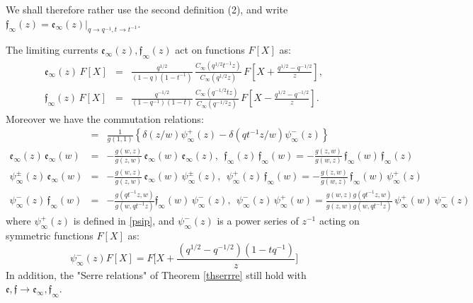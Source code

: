 We shall therefore rather use the second definition (2), and write
${\mathfrak f}_\infty(z)={\mathfrak e}_\infty(z)\vert_{q\to q^{-1},t\to t^{-1}}$.

\begin{thm}\label{bobothm}
The limiting currents ${\mathfrak e}_\infty(z),{\mathfrak f}_\infty(z)$ act on functions 
$F[X]$ as:
\begin{eqnarray*}
{\mathfrak e}_\infty(z)\, F[X] 
&=&\frac{q^{1/2}}{(1-q)(1-t^{-1})} \,\frac{C_\infty(q^{1/2}t^{-1}z)}{C_\infty(q^{1/2}z)} \,
F\left[ X+\frac{q^{1/2}-q^{-1/2}}{z}\right],\\
{\mathfrak f}_\infty(z)\, F[X] 
&=&\frac{q^{-1/2}}{(1-q^{-1})(1-t)}\,\frac{C_\infty(q^{-1/2}t z)}{C_\infty(q^{-1/2}z)} \,
F\left[ X-\frac{q^{1/2}-q^{-1/2}}{z}\right].
\end{eqnarray*}
Moreover we have the commutation relations:
\begin{eqnarray*}[{\mathfrak e}_\infty(z),{\mathfrak f}_\infty(w)] &=&\frac{1}{g(1,1)}\left\{ \delta(z/w)
\psi_\infty^+(z)-\delta(q t^{-1} z/w) \psi_\infty^-(z)\right\}\\
{\mathfrak e}_\infty(z)\,{\mathfrak e}_\infty(w)&=&-\frac{g(w,z)}{g(z,w)}\, {\mathfrak e}_\infty(w)\, {\mathfrak e}_\infty(z),\ \ {\mathfrak f}_\infty(z)\,{\mathfrak f}_\infty(w)=-\frac{g(z,w)}{g(w,z)}\, {\mathfrak f}_\infty(w)\, {\mathfrak f}_\infty(z)\\
\psi_\infty^\pm(z)\,{\mathfrak e}_\infty(w)&=& -\frac{g(w,z)}{g(z,w)}\, {\mathfrak e}_\infty(w)\, \psi_\infty^\pm(z), \ \ 
\psi_\infty^+(z)\,{\mathfrak f}_\infty(w)=-\frac{g(z,w)}{g(w,z)} \, {\mathfrak f}_\infty(w)\, \psi_\infty^+(z)\\
\psi_\infty^-(z)\,{\mathfrak f}_\infty(w)&=&-\frac{g(qt^{-1}z,w)}{g(w,qt^{-1}z)} {\mathfrak f}_\infty(w)\, \psi_\infty^-(z), \ \
\psi_\infty^-(z)\,\psi_\infty^+(w)=\frac{g(w,z)g(qt^{-1}z,w)}{g(z,w)g(w,qt^{-1}z)}\, \psi_\infty^+(w)\,\psi_\infty^-(z)
\end{eqnarray*}
where $\psi_\infty^+(z)$ is defined in \eqref{psip}, and  $\psi_\infty^-(z)$ is a power series of $z^{-1}$
acting on symmetric functions $F[X]$ as:
$$\psi_\infty^-(z) F[X]=F\Big[X+\frac{(q^{1/2}-q^{-1/2})(1-t q^{-1})}{z}\Big] $$
In addition, the "Serre relations" of Theorem \ref{thserrre} still hold with 
${\mathfrak e},{\mathfrak f}\to {\mathfrak e}_\infty, {\mathfrak f}_\infty$.
\end{thm}

